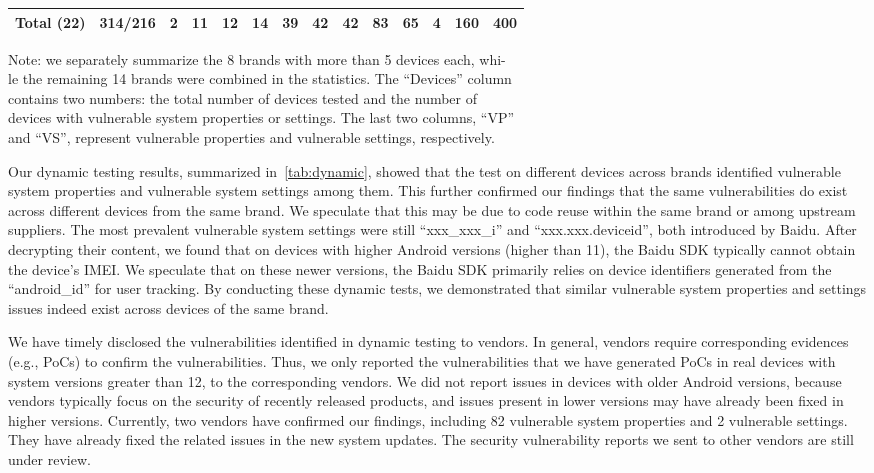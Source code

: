 \begin{table}[t]
\begin{threeparttable}
{\begin{tabular}{|c|c|cccccccccc|c|c|}
Total (22)             & 314/216                     & 2  & 11 & 12 & 14 & 39  & 42  & 42  & 83  & 65  & 4   & 160                    & 400                    \\ \hline
\end{tabular}
}
\begin{tablenotes}
	\footnotesize
	\item Note: we separately summarize the 8 brands with more than 5 devices each, whi-\\le the remaining 14 brands were combined in the statistics. The ``Devices'' column \\contains two numbers: the total number of devices tested and the number of \\devices with vulnerable system properties or settings. The last two columns, ``VP'' \\and ``VS'', represent vulnerable properties and vulnerable settings, respectively.
\end{tablenotes}
\end{threeparttable}
\end{table}




Our dynamic testing results, summarized in~\autoref{tab:dynamic}, showed that the test on \dynamicmodels different devices across \dynamicbrands brands identified \dynamicpropertiescase vulnerable system properties and \dynamicsettingscase vulnerable system settings among them.
This further confirmed our findings that the same vulnerabilities do exist across different devices from the same brand. We speculate that this may be due to code reuse within the same brand or among upstream suppliers.
The most prevalent vulnerable system settings were still ``xxx\_xxx\_i'' and ``xxx.xxx.deviceid'', both introduced by Baidu.
After decrypting their content, we found that on devices with higher Android versions (higher than 11), the Baidu SDK typically cannot obtain the device's IMEI. 
We speculate that on these newer versions, the Baidu SDK primarily relies on device identifiers generated from the ``android\_id'' for user tracking.
By conducting these dynamic tests, we demonstrated that similar vulnerable system properties and settings issues indeed exist across devices of the same brand.

We have timely disclosed the vulnerabilities identified in dynamic testing to vendors.
In general, vendors require corresponding evidences (e.g., PoCs) to confirm the vulnerabilities. Thus, we only reported the vulnerabilities that we have generated PoCs in real devices with system versions greater than 12, to the corresponding vendors.
We did not report issues in devices with older Android versions, because vendors typically focus on the security of recently released products, and issues present in lower versions may have already been fixed in higher versions.
Currently, two vendors have confirmed our findings, including 82 vulnerable system properties and 2 vulnerable settings. 
They have already fixed the related issues in the new system updates. 
The security vulnerability reports we sent to other vendors are still under review.

